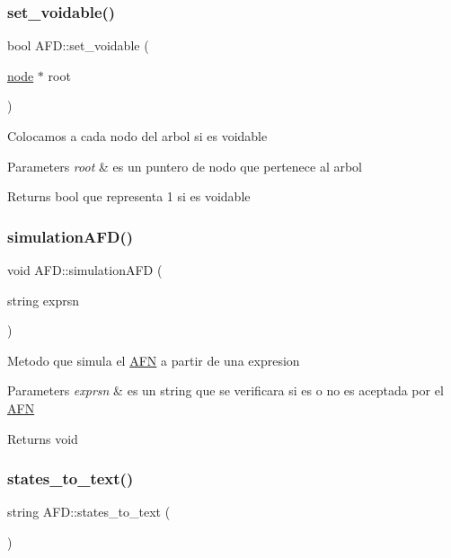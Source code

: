 \subsubsection{\texorpdfstring{set\+\_\+voidable()}{set\_voidable()}}
{\footnotesize\ttfamily bool A\+F\+D\+::set\+\_\+voidable (\begin{DoxyParamCaption}\item[{\hyperlink{structnode}{node} $\ast$}]{root }\end{DoxyParamCaption})}

Colocamos a cada nodo del arbol si es voidable 
\begin{DoxyParams}{Parameters}
{\em root} & es un puntero de nodo que pertenece al arbol \\
\hline
\end{DoxyParams}
\begin{DoxyReturn}{Returns}
bool que representa 1 si es voidable 
\end{DoxyReturn}
\hypertarget{class_a_f_d_a536493b9063f9e9c4eb734d3560f7a7d}{}\label{class_a_f_d_a536493b9063f9e9c4eb734d3560f7a7d} 
\subsubsection{\texorpdfstring{simulation\+A\+F\+D()}{simulationAFD()}}
{\footnotesize\ttfamily void A\+F\+D\+::simulation\+A\+FD (\begin{DoxyParamCaption}\item[{string}]{exprsn }\end{DoxyParamCaption})}

Metodo que simula el \hyperlink{class_a_f_n}{A\+FN} a partir de una expresion 
\begin{DoxyParams}{Parameters}
{\em exprsn} & es un string que se verificara si es o no es aceptada por el \hyperlink{class_a_f_n}{A\+FN} \\
\hline
\end{DoxyParams}
\begin{DoxyReturn}{Returns}
void 
\end{DoxyReturn}
\hypertarget{class_a_f_d_a8c3da4d57cbc9bae76e775cb6b216d64}{}\label{class_a_f_d_a8c3da4d57cbc9bae76e775cb6b216d64} 
\subsubsection{\texorpdfstring{states\+\_\+to\+\_\+text()}{states\_to\_text()}}
{\footnotesize\ttfamily string A\+F\+D\+::states\+\_\+to\+\_\+text (\begin{DoxyParamCaption}{ }\end{DoxyParamCaption})}

